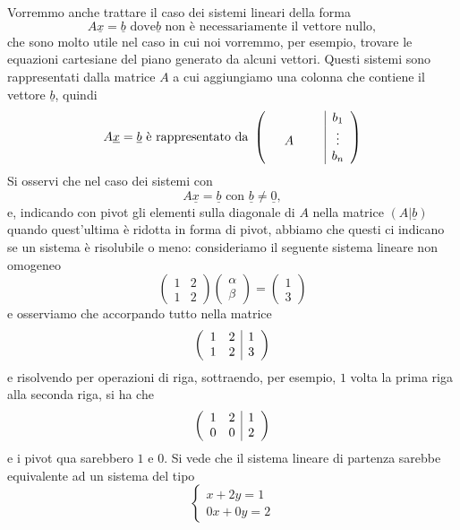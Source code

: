 Vorremmo anche trattare il caso dei sistemi lineari della forma
$$
  A\underline{x} = \underline{b} \text{ dove} \underline{b} \text{ non è necessariamente il vettore nullo},
$$
che sono molto utile nel caso in cui noi vorremmo, per esempio, trovare le equazioni cartesiane del piano generato da alcuni vettori. Questi sistemi sono rappresentati dalla matrice $A$ a cui aggiungiamo una colonna che contiene il vettore $\underline{b}$, quindi
$$
  A\underline{x} = \underline{b} \text{ è rappresentato da } \left( \begin{array}{c c c c | c}
    & &   & & b_1 \\
    & A & & & \vdots \\
    & &   & & b_n
  \end{array} \right)
$$
Si osservi che nel caso dei sistemi con
$$
  A \underline{x} = \underline{b} \text{ con } \underline{b} \neq \underline{0},
$$
e, indicando con pivot gli elementi sulla diagonale di $A$ nella matrice $(A | \underline{b})$ quando quest'ultima è ridotta in forma di pivot, abbiamo che questi ci indicano se un sistema è risolubile o meno: consideriamo il seguente sistema lineare non omogeneo
$$
  \begin{pmatrix}
    1 & 2 \\
    1 & 2
  \end{pmatrix} \begin{pmatrix}
    \alpha \\
    \beta
  \end{pmatrix} = \begin{pmatrix}
    1 \\
    3
  \end{pmatrix}
$$
e osserviamo che accorpando tutto nella matrice
$$
  \left( \begin{array}{c c | c}
    1 & 2 & 1 \\
    1 & 2 & 3 
  \end{array} \right)
$$
e risolvendo per operazioni di riga, sottraendo, per esempio, $1$ volta la prima riga alla seconda riga, si ha che
$$
  \left( \begin{array}{c c | c}
    1 & 2 & 1 \\
    0 & 0 & 2
  \end{array} \right)
$$
e i pivot qua sarebbero $1$ e $0$. Si vede che il sistema lineare di partenza sarebbe equivalente ad un sistema del tipo
$$
  \begin{cases}
    x + 2y = 1 \\
    0x + 0y = 2
  \end{cases}
$$
